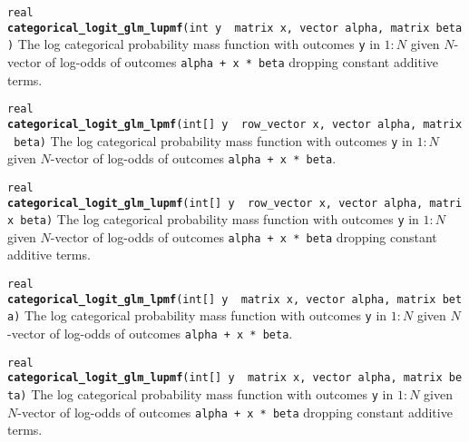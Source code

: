 \documentclass[
  10pt,
]{book}
\begin{document}

\texttt{real} \textbf{\texttt{categorical\_logit\_glm\_lupmf}}\texttt{(int\ y\ \textbar{}\ matrix\ x,\ vector\ alpha,\ matrix\ beta)}\newline
The log categorical probability mass function with outcomes \texttt{y} in
\(1:N\) given \(N\)-vector of log-odds of outcomes \texttt{alpha\ +\ x\ *\ beta}
dropping constant additive terms.


\texttt{real} \textbf{\texttt{categorical\_logit\_glm\_lpmf}}\texttt{(int{[}{]}\ y\ \textbar{}\ row\_vector\ x,\ vector\ alpha,\ matrix\ beta)}\newline
The log categorical probability mass function with outcomes \texttt{y} in
\(1:N\) given \(N\)-vector of log-odds of outcomes \texttt{alpha\ +\ x\ *\ beta}.


\texttt{real} \textbf{\texttt{categorical\_logit\_glm\_lupmf}}\texttt{(int{[}{]}\ y\ \textbar{}\ row\_vector\ x,\ vector\ alpha,\ matrix\ beta)}\newline
The log categorical probability mass function with outcomes \texttt{y} in
\(1:N\) given \(N\)-vector of log-odds of outcomes \texttt{alpha\ +\ x\ *\ beta}
dropping constant additive terms.


\texttt{real} \textbf{\texttt{categorical\_logit\_glm\_lpmf}}\texttt{(int{[}{]}\ y\ \textbar{}\ matrix\ x,\ vector\ alpha,\ matrix\ beta)}\newline
The log categorical probability mass function with outcomes \texttt{y} in
\(1:N\) given \(N\)-vector of log-odds of outcomes \texttt{alpha\ +\ x\ *\ beta}.


\texttt{real} \textbf{\texttt{categorical\_logit\_glm\_lupmf}}\texttt{(int{[}{]}\ y\ \textbar{}\ matrix\ x,\ vector\ alpha,\ matrix\ beta)}\newline
The log categorical probability mass function with outcomes \texttt{y} in
\(1:N\) given \(N\)-vector of log-odds of outcomes \texttt{alpha\ +\ x\ *\ beta}
dropping constant additive terms.
\end{document}
